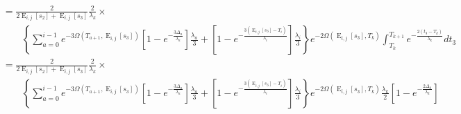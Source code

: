 \documentclass{article}
\DeclareMathOperator{\E}{E}
\begin{document}
\begin{align*}
    &=\frac{2}{2\E_{i,j}[s_2]+\E_{i,j}[s_3]}\frac{2}{\lambda_{k}}\times\\
    &\qquad\left\{\sum_{a=0}^{i-1}e^{-3\Omega(T_{a+1},\E_{i,j}[s_3])}
    \left[1-e^{-\frac{3\Delta_a}{\lambda_a}}\right]\frac{\lambda_a}{3}+
    \left[1-e^{-\frac{3\left(\E_{i,j}[s_3]-T_{i}\right)}{\lambda_{i}}}\right]
    \frac{\lambda_{i}}{3}\right\}
    e^{-2\Omega(\E_{i,j}[s_3],T_k)}
    \int_{T_k}^{T_{k+1}}e^{-\frac{2(t_3-T_k)}{\lambda_k}}dt_3\\
    &=\frac{2}{2\E_{i,j}[s_2]+\E_{i,j}[s_3]}\frac{2}{\lambda_{k}}\times\\
    &\qquad\left\{\sum_{a=0}^{i-1}e^{-3\Omega(T_{a+1},\E_{i,j}[s_3])}
    \left[1-e^{-\frac{3\Delta_a}{\lambda_a}}\right]\frac{\lambda_a}{3}+
    \left[1-e^{-\frac{3\left(\E_{i,j}[s_3]-T_{i}\right)}{\lambda_{i}}}\right]
    \frac{\lambda_{i}}{3}\right\}
    e^{-2\Omega(\E_{i,j}[s_3],T_k)}
    \frac{\lambda_k}{2}\left[1-e^{-\frac{2\Delta_k}{\lambda_k}}\right]
\end{align*}
\end{document}
